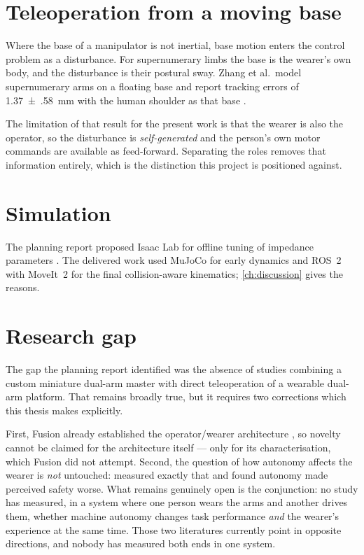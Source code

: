 \section{Teleoperation from a moving base}

Where the base of a manipulator is not inertial, base motion enters the
control problem as a disturbance. For supernumerary limbs the base is the
wearer's own body, and the disturbance is their postural sway. Zhang et
al.\ model supernumerary arms on a floating base and report tracking errors of
\SI{1.37(58)}{\milli\metre} with the human shoulder as that base
\cite{zhang2024motioncomp}.

The limitation of that result for the present work is that the wearer is also
the operator, so the disturbance is \emph{self-generated} and the person's own
motor commands are available as feed-forward. Separating the roles removes
that information entirely, which is the distinction this project is positioned
against.

\section{Simulation}

The planning report proposed Isaac Lab for offline tuning of impedance
parameters \cite{isaaclab}. The delivered work used MuJoCo for early dynamics
and ROS~2 with MoveIt~2 for the final collision-aware kinematics;
\cref{ch:discussion} gives the reasons.

\section{Research gap}

The gap the planning report identified was the absence of studies combining a
custom miniature dual-arm master with direct teleoperation of a wearable
dual-arm platform. That remains broadly true, but it requires two corrections
which this thesis makes explicitly.

First, Fusion already established the operator/wearer architecture
\cite{saraiji2018fusion}, so novelty cannot be claimed for the architecture
itself --- only for its characterisation, which Fusion did not attempt.
Second, the question of how autonomy affects the wearer is \emph{not}
untouched: \cite{zhou2026proxemics} measured exactly that and found autonomy
made perceived safety worse. What remains genuinely open is the conjunction:
no study has measured, in a system where one person wears the arms and another
drives them, whether machine autonomy changes task performance \emph{and} the
wearer's experience at the same time. Those two literatures currently point in
opposite directions, and nobody has measured both ends in one system.
